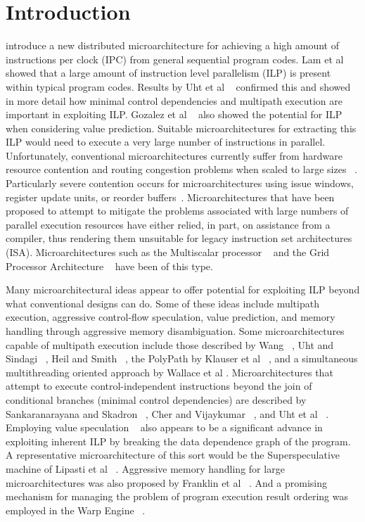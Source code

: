 \documentclass[10pt,twocolumn]{IEEEtran}
\begin{document}
\section{Introduction}
%
 introduce a new distributed microarchitecture for achieving
a high amount of instructions per clock (IPC) from general 
sequential program codes.
Lam et al ~\cite{Lam92} showed that a large amount of instruction
level parallelism (ILP) is present within typical program codes.
Results by Uht et al ~\cite{Uht95} confirmed this and showed in more detail
how minimal control dependencies and multipath execution are
important in exploiting ILP.
Gozalez et al ~\cite{Gon97,gonzalez98limits}
also showed the potential for ILP when considering value prediction.
Suitable microarchitectures for extracting this ILP would need to
execute a very large number of instructions in parallel.
Unfortunately, conventional microarchitectures currently suffer
from hardware resource contention and routing congestion problems when
scaled to large sizes ~\cite{Palacharla97}.  
Particularly severe contention occurs for 
microarchitectures using
issue windows,
register update units, or reorder buffers~\cite{Smith95,Bannon95,Kessler98}.
Microarchitectures that have been proposed to attempt to mitigate
the problems associated with large numbers of parallel execution
resources have either relied, in part, on assistance from a
compiler, thus rendering them unsuitable for legacy instruction
set architectures (ISA).  
Microarchitectures such as the Multiscalar 
processor ~\cite{Sohi95} and the Grid Processor Architecture ~\cite{Nag01} 
have been of this type.  

Many microarchitectural ideas appear to offer potential for
exploiting ILP beyond what conventional designs can do.
Some of these ideas include multipath execution,
aggressive control-flow speculation, value prediction, and
memory handling through aggressive memory disambiguation.
Some microarchitectures capable of multipath
execution include those described by Wang ~\cite{Wang90}, 
Uht and Sindagi ~\cite{Uht95},
Heil and Smith ~\cite{Heil96},
the PolyPath by Klauser et al ~\cite{Klauser98a},
and a simultaneous multithreading oriented approach by
Wallace et al \cite{Wallace98}. 
Microarchitectures that attempt to 
execute control-independent instructions
beyond the join of conditional branches (minimal control
dependencies) are described by 
Sankaranarayana and Skadron ~\cite{Sank01a,Sank01b}, 
Cher and Vijaykumar ~\cite{Cher01}, and Uht et al ~\cite{Uht01}.
Employing
value speculation ~\cite{lipasti96exceeding,lipasti97performance}
also appears to be a significant advance in exploiting inherent ILP
by breaking the data dependence graph of the program.
A representative microarchitecture of this sort would
be the Superspeculative machine of 
Lipasti et al ~\cite{lipasti97superspeculative}.
Aggressive memory handling for large microarchitectures
was also proposed by Franklin et al ~\cite{Franklin96}.
And a promising mechanism for managing the problem of program
execution result ordering was employed in the 
Warp Engine ~\cite{Cleary95}.
\end{document}
